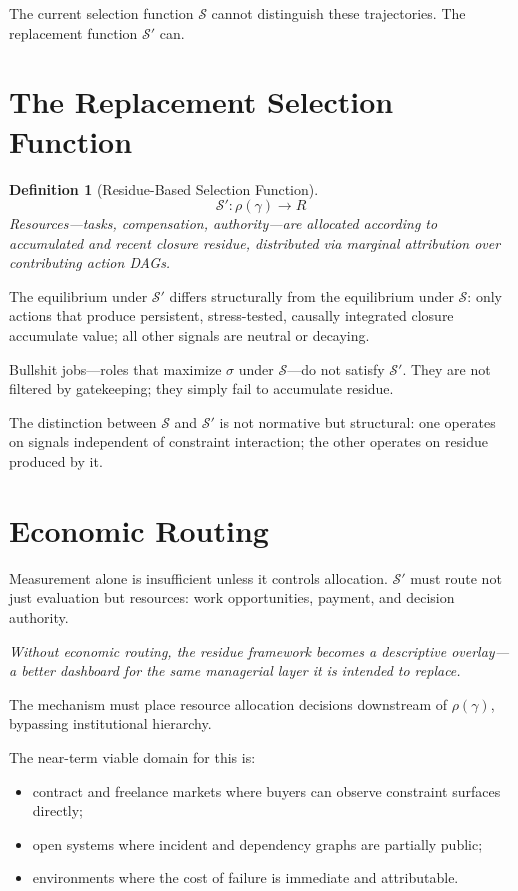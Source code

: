 \documentclass[12pt]{article}
\newtheorem{definition}{Definition}
\begin{document}
The current selection function $\mathcal{S}$ cannot distinguish these
trajectories. The replacement function $\mathcal{S}'$ can.

\section{The Replacement Selection Function}

\begin{definition}[Residue-Based Selection Function]
\[
  \mathcal{S}' : \rho(\gamma) \rightarrow R
\]
Resources---tasks, compensation, authority---are allocated according to
accumulated and recent closure residue, distributed via marginal
attribution over contributing action DAGs.
\end{definition}

The equilibrium under $\mathcal{S}'$ differs structurally from the
equilibrium under $\mathcal{S}$: only actions that produce persistent,
stress-tested, causally integrated closure accumulate value; all other
signals are neutral or decaying.

Bullshit jobs---roles that maximize $\sigma$ under $\mathcal{S}$---do
not satisfy $\mathcal{S}'$. They are not filtered by gatekeeping; they
simply fail to accumulate residue.

The distinction between $\mathcal{S}$ and $\mathcal{S}'$ is not
normative but structural: one operates on signals independent of
constraint interaction; the other operates on residue produced by it.

\section{Economic Routing}

Measurement alone is insufficient unless it controls allocation.
$\mathcal{S}'$ must route not just evaluation but resources: work
opportunities, payment, and decision authority.

\medskip
\noindent\textit{Without economic routing, the residue framework becomes
a descriptive overlay---a better dashboard for the same managerial layer
it is intended to replace.}
\medskip

The mechanism must place resource allocation decisions downstream of
$\rho(\gamma)$, bypassing institutional hierarchy.

The near-term viable domain for this is:
\begin{itemize}
  \item contract and freelance markets where buyers can observe
    constraint surfaces directly;
  \item open systems where incident and dependency graphs are partially
    public;
  \item environments where the cost of failure is immediate and
    attributable.
\end{itemize}
\end{document}
